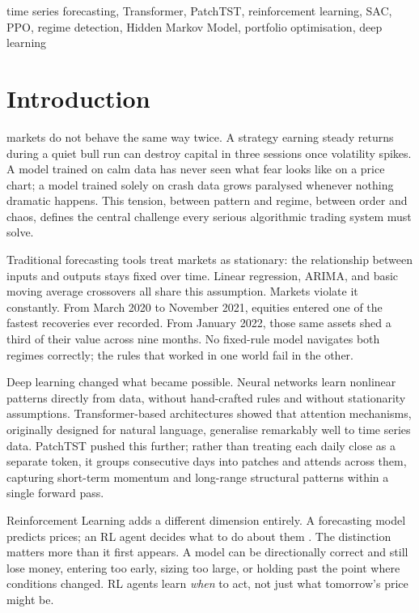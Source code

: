 \documentclass[journal]{IEEEtran}
\begin{document}
\begin{IEEEkeywords}
time series forecasting, Transformer, PatchTST, reinforcement learning,
SAC, PPO, regime detection, Hidden Markov Model, portfolio optimisation,
deep learning
\end{IEEEkeywords}

\IEEEpeerreviewmaketitle

\section{Introduction}
\label{sec:intro}

 markets do not behave the same way twice. A
strategy earning steady returns during a quiet bull run can destroy capital
in three sessions once volatility spikes. A model trained on calm data has
never seen what fear looks like on a price chart; a model trained solely
on crash data grows paralysed whenever nothing dramatic happens. This
tension, between pattern and regime, between order and chaos, defines the
central challenge every serious algorithmic trading system must solve.

Traditional forecasting tools treat markets as stationary: the
relationship between inputs and outputs stays fixed over time. Linear
regression, ARIMA, and basic moving average crossovers all share this
assumption. Markets violate it constantly. From March 2020 to November
2021, equities entered one of the fastest recoveries ever recorded. From
January 2022, those same assets shed a third of their value across nine
months. No fixed-rule model navigates both regimes correctly; the rules
that worked in one world fail in the other.

Deep learning changed what became possible. Neural networks learn
nonlinear patterns directly from data, without hand-crafted rules and
without stationarity assumptions. Transformer-based architectures
\cite{informer,autoformer,tft} showed that attention mechanisms,
originally designed for natural language, generalise remarkably well to
time series data. PatchTST \cite{patchtst} pushed this further; rather
than treating each daily close as a separate token, it groups consecutive
days into patches and attends across them, capturing short-term momentum
and long-range structural patterns within a single forward pass.

Reinforcement Learning adds a different dimension entirely. A forecasting
model predicts prices; an RL agent decides what to do about them
\cite{sarl,stockformer}. The distinction matters more than it first
appears. A model can be directionally correct and still lose money,
entering too early, sizing too large, or holding past the point where
conditions changed. RL agents learn \emph{when} to act, not just what
tomorrow's price might be.
\end{document}
